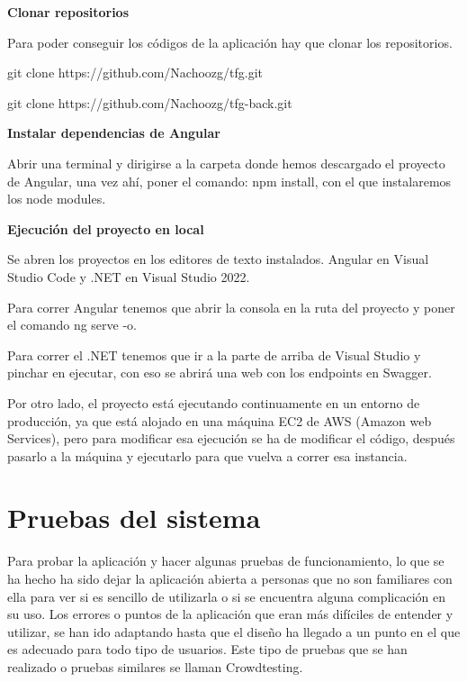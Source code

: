 \textbf{Clonar repositorios}

Para poder conseguir los códigos de la aplicación hay que clonar los repositorios.

git clone https://github.com/Nachoozg/tfg.git

git clone https://github.com/Nachoozg/tfg-back.git

\newpage

\textbf{Instalar dependencias de Angular}

Abrir una terminal y dirigirse a la carpeta donde hemos descargado el proyecto de Angular, una vez ahí, poner el comando: npm install, con el que instalaremos los node modules.

\textbf{Ejecución del proyecto en local}

Se abren los proyectos en los editores de texto instalados. Angular en Visual Studio Code y .NET en Visual Studio 2022.

Para correr Angular tenemos que abrir la consola en la ruta del proyecto y poner el comando ng serve -o.

Para correr el .NET tenemos que ir a la parte de arriba de Visual Studio y pinchar en ejecutar, con eso se abrirá una web con los endpoints en Swagger.


Por otro lado, el proyecto está ejecutando continuamente en un entorno de producción, ya que está alojado en una máquina EC2 de AWS (Amazon web Services), pero para modificar esa ejecución se ha de modificar el código, después pasarlo a la máquina y ejecutarlo para que vuelva a correr esa instancia.

\section{Pruebas del sistema}

Para probar la aplicación y hacer algunas pruebas de funcionamiento, lo que se ha hecho ha sido dejar la aplicación abierta a personas que no son familiares con ella para ver si es sencillo de utilizarla o si se encuentra alguna complicación en su uso. Los errores o puntos de la aplicación que eran más difíciles de entender y utilizar, se han ido adaptando hasta que el diseño ha llegado a un punto en el que es adecuado para todo tipo de usuarios. Este tipo de pruebas que se han realizado o pruebas similares se llaman Crowdtesting.